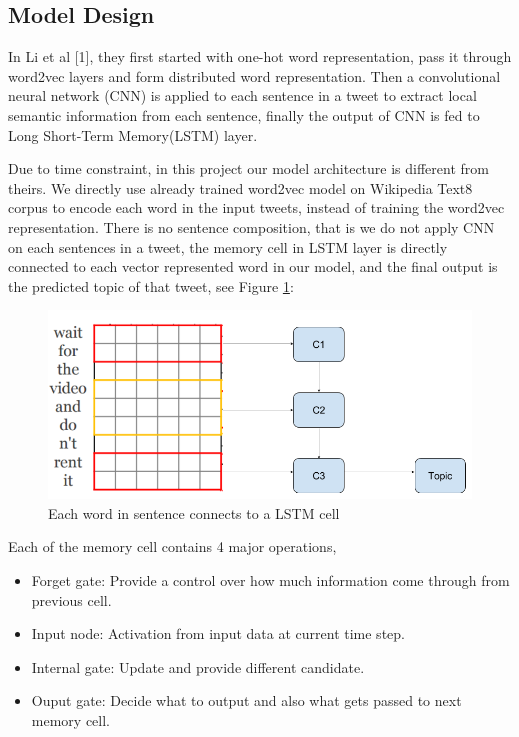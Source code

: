 \documentclass[journal, a4paper]{IEEEtran}
\begin{document}
\subsection{Model Design}
In Li et al [1], they first started with one-hot word representation, pass it through word2vec layers and form distributed word representation. Then a convolutional neural network (CNN) is applied to each sentence in a tweet to extract local semantic information from each sentence, finally the output of CNN is fed to Long Short-Term Memory(LSTM) layer. 

Due to time constraint, in this project our model architecture is different from theirs. We directly use already trained word2vec model on Wikipedia Text8 corpus to encode each word in the input tweets, instead of training the word2vec representation. There is no sentence composition, that is we do not apply CNN on each sentences in a tweet, the memory cell in LSTM layer is directly connected to each vector represented word in our model, and the final output is the predicted topic of that tweet, see Figure \ref{fig:4}:
\begin{figure}[!hbt]
	\centering
	\includegraphics[width=\columnwidth]{cell.png}
	\caption{Each word in sentence connects to a LSTM cell}
	\label{fig:4}
\end{figure}

Each of the memory cell contains 4 major operations, 
\begin{itemize}
\item Forget gate: Provide a control over how much information come through from previous cell.
\item Input node: Activation from input data at current time step.
\item Internal gate: Update and provide different candidate.
\item Ouput gate: Decide what to output and also what gets passed to next memory cell.
\end{itemize} 
\end{document}
